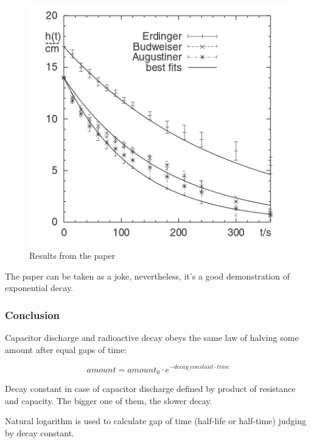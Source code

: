 \begin{figure}[H]
\centering
\includegraphics[scale=0.66]{log/beer.png}
\caption{Results from the paper}
\end{figure}

The paper can be taken as a joke, nevertheless, it's a good demonstration of exponential decay.

\subsubsection{Conclusion}

Capacitor discharge and radioactive decay obeys the same law of halving some amount after equal gaps of time:

\[
amount=amount_{0} \cdot e^{- decay\_constant \cdot time}
\]

Decay constant in case of capacitor discharge defined by product of resistance and capacity.
The bigger one of them, the slower decay.

Natural logarithm is used to calculate gap of time (half-life or half-time) judging by decay constant.

